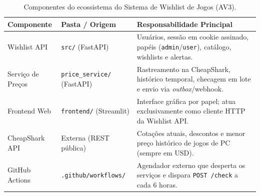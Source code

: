 \documentclass[11pt,a4paper]{article}
\begin{document}
\begin{table}[H]
\centering
\caption{Componentes do ecossistema do Sistema de Wishlist de Jogos (AV3).}
\label{tab:componentes}
\footnotesize
\begin{tabularx}{\textwidth}{@{}l l Y@{}}
\toprule
\textbf{Componente} & \textbf{Pasta / Origem} & \textbf{Responsabilidade Principal} \\
\midrule
Wishlist API & \texttt{src/} (FastAPI) & Usuários, sessão em cookie assinado, papéis (\texttt{admin}/\texttt{user}), catálogo, wishlists e alertas. \\
Serviço de Preços & \texttt{price\_service/} (FastAPI) & Rastreamento na CheapShark, histórico temporal, checagem em lote e envio via \textit{outbox}/webhook. \\
Frontend Web & \texttt{frontend/} (Streamlit) & Interface gráfica por papel; atua exclusivamente como cliente HTTP da Wishlist API. \\
CheapShark API & Externa (REST pública) & Cotações atuais, descontos e menor preço histórico de jogos de PC (sempre em USD). \\
GitHub Actions & \texttt{.github/workflows/} & Agendador externo que desperta os serviços e dispara \texttt{POST /check} a cada 6 horas. \\
\bottomrule
\end{tabularx}
\end{table}
\end{document}
